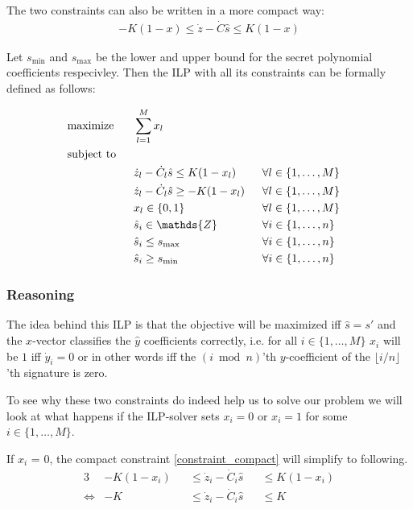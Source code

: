The two constraints can also be written in a more compact way:
\begin{align}
	\label{constraint_compact}
	 - K (1 - x) \leq \dot{z}- \dot{C}\hat{s}  \leq K (1 - x)
\end{align}

Let $s_{\text{min}}$ and $s_{\text{max}}$ be the lower and upper bound for the secret polynomial coefficients respecivley. Then the ILP with all its constraints can be formally defined as follows:

\begin{alignat}{3}
	&\text{maximize} &\text{\phantom{ii}}& \sum_{l = 1}^M x_{l} \\
	&\text{subject to} && \\
	&&&\dot{z}_l - \dot{C}_l\hat{s}  \leq K (1 - x_l) &\text{\phantom{ii}}& \forall l \in \{1, \ldots, M \}\\
	&&&\dot{z}_l - \dot{C}_l\hat{s}   \geq - K (1 - x_l) &&  \forall l \in \{1, \ldots, M \} \\
	&&&x_l \in \{0, 1\} && \forall l \in \{1, \ldots, M \}\\
	&&&\hat{s}_i \in  \mathds{Z} && \forall i \in \{1, \ldots, n \}\\
	&&&\hat{s}_i \leq  s_{\text{max}} && \forall i \in \{1, \ldots, n \}\\
	&&&\hat{s}_i \geq  s_{\text{min}} && \forall i \in \{1, \ldots, n \} 
\end{alignat}

\subsubsection{Reasoning}
The idea behind this ILP is that the objective will be maximized iff $\hat{s} = s'$ and the $x$-vector classifies the $\hat{y}$ coefficients correctly, i.e.
for all $i \in \{1, \ldots, M\}$ $x_{i}$ will be $1$ iff $\dot{y}_i = 0$ or in other words iff the $(i \bmod n)$'th $y$-coefficient of the $\lfloor i / n \rfloor$'th signature is zero.

To see why these two constraints do indeed help us to solve our problem we will look at what happens if the ILP-solver sets $x_{i} = 0$ or $x_{i} = 1$ for some $i \in \{1, \ldots, M\}$.

If $x_{i}$ = 0, the compact constraint \eqref{constraint_compact} will simplify to following.
\begin{alignat}{3}
	 &-K(1 - x_{i}) &&\leq \dot{z}_{i} - \dot{C}_{i}\hat{s}  &&\leq K(1 - x_{i}) \\
	 \label{alwaystrue}
	 \Leftrightarrow&- K &&\leq \dot{z}_{i} - \dot{C}_{i}\hat{s}  &&\leq K
\end{alignat}

